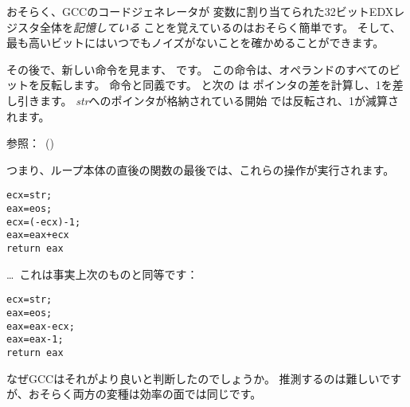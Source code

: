 おそらく、GCCのコードジェネレータが \Tchar 変数に割り当てられた32ビットEDXレジスタ全体を\emph{記憶している}
ことを覚えているのはおそらく簡単です。
そして、最も高いビットにはいつでもノイズがないことを確かめることができます。

\label{strlen_NOT_ADD}

その後で、新しい命令を見ます、 \NOT です。 この命令は、オペランドのすべてのビットを反転します。
命令と同義です。 
\NOT と次の \ADD は ポインタの差を計算し、1を差し引きます。 
\emph{str}へのポインタが格納されている開始 \ECX では反転され、1が減算されます。

参照：\q{\SignedNumbersSectionName}~()

つまり、ループ本体の直後の関数の最後では、これらの操作が実行されます。

\begin{lstlisting}[style=customc]
ecx=str;
eax=eos;
ecx=(-ecx)-1; 
eax=eax+ecx
return eax
\end{lstlisting}

\dots~これは事実上次のものと同等です：

\begin{lstlisting}[style=customc]
ecx=str;
eax=eos;
eax=eax-ecx;
eax=eax-1;
return eax
\end{lstlisting}

なぜGCCはそれがより良いと判断したのでしょうか。
推測するのは難しいですが、おそらく両方の変種は効率の面では同じです。
